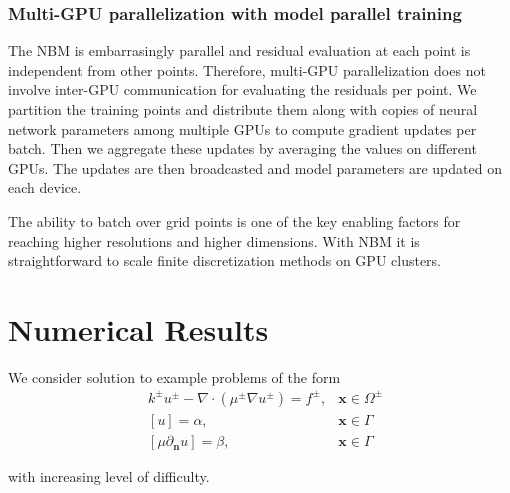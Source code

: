 \documentclass{elsarticle}
\begin{document}
\subsubsection{Multi-GPU parallelization with model parallel training}
The NBM is embarrasingly parallel and residual evaluation at each point is independent from other points. Therefore, multi-GPU parallelization does not involve inter-GPU communication for evaluating the residuals per point. We partition the training points and distribute them along with copies of neural network parameters among multiple GPUs to compute gradient updates per batch. Then we aggregate these updates by averaging the values on different GPUs. The updates are then broadcasted and model parameters are updated on each device.

The ability to batch over grid points is one of the key enabling factors for reaching higher resolutions and higher dimensions. With NBM it is straightforward to scale finite discretization methods on GPU clusters.


\section{Numerical Results} \label{sec:examples}

We consider solution to example problems of the form
\begin{align*}
	 & k^{\pm}u^{\pm} - \nabla \cdot (\mu^{\pm}\nabla u^\pm)=f^{\pm}, & \mathbf{x}\in\Omega^\pm \\
	 & [u]=\alpha,                                                    & \mathbf{x} \in \Gamma   \\
	 & [\mu \partial_{\mathbf{n}}u]=\beta,                            & \mathbf{x} \in \Gamma
\end{align*}

with increasing level of difficulty.


%
\end{document}
